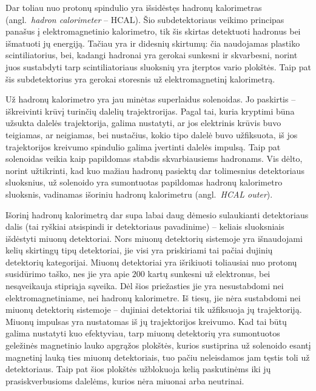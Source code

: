 \documentclass[a4paper, 12pt]{article}
\begin{document}
Dar toliau nuo protonų spindulio yra išsidėstęs hadronų kalorimetras (angl.\ \textit{hadron calorimeter} -- HCAL).
Šio subdetektoriaus veikimo principas panašus į elektromagnetinio kalorimetro, tik šis skirtas detektuoti
hadronus bei išmatuoti jų energiją.
Tačiau yra ir didesnių skirtumų: čia naudojamas plastiko scintiliatorius, bei, kadangi hadronai yra gerokai
sunkesni ir skvarbesni, norint juos sustabdyti tarp scintiliatoriaus sluoksnių yra įterptos vario plokštės.
Taip pat šis subdetektorius yra gerokai storesnis už elektromagnetinį kalorimetrą.

Už hadronų kalorimetro yra jau minėtas superlaidus solenoidas.
Jo paskirtis -- iškreivinti krūvį turinčių dalelių trajektrorijas.
Pagal tai, kuria kryptimi būna užsukta dalelės trajektorija, galima nustatyti, ar jos elektrinis krūvis buvo
teigiamas, ar neigiamas, bei nustačius, kokio tipo dalelė buvo užfiksuota, iš jos trajektorijos kreivumo
spindulio galima įvertinti dalelės impulsą.
Taip pat solenoidas veikia kaip papildomas stabdis skvarbiausiems hadronams.
Vis dėlto, norint užtikrinti, kad kuo mažiau hadronų pasiektų dar tolimesnius detektoriaus sluoksnius, už
solenoido yra sumontuotas papildomas hadronų kalorimetro sluoksnis, vadinamas išoriniu hadronų kalorimetru
(angl.\ \textit{HCAL outer}).

Išorinį hadronų kalorimetrą dar supa labai daug dėmesio sulaukianti detektoriaus dalis (tai ryškiai atsispindi
ir detektoriaus pavadinime) -- keliais sluoksniais išdėstyti miuonų detektoriai.
Nors miuonų detektorių sistemoje yra išnaudojami kelių skirtingų tipų detektoriai, jie visi yra priskiriami
tai pačiai dujinių detektorių kategorijai.
Miuonų detektoriai yra išrikiuoti toliausiai nuo protonų susidūrimo taško, nes jie yra apie $200$ kartų
sunkesni už elektronus, bei nesąveikauja stipriąja sąveika.
Dėl šios priežasties jie yra nesustabdomi nei elektromagnetiniame, nei hadronų kalorimetre.
Iš tiesų, jie nėra sustabdomi nei miuonų detektorių sistemoje -- dujiniai detektoriai tik užfiksuoja jų
trajektoriją.
Miuonų impulsas yra nustatomas iš jų trajektorijos kreivumo.
Kad tai būtų galima nustatyti kuo efektyviau, tarp miuonų detektorių yra sumontuotos geležinės magnetinio
lauko apgrąžos plokštės, kurios sustiprina už solenoido esantį magnetinį lauką ties miuonų detektoriais,
tuo pačiu neleisdamos jam tęstis toli už detektoriaus.
Taip pat šios plokštės užblokuoja kelią paskutinėms iki jų prasiskverbusioms dalelėms, kurios nėra miuonai
arba neutrinai.
\end{document}

